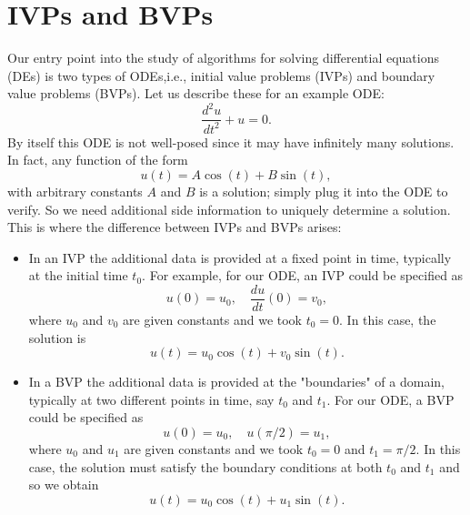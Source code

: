 \chapter{IVPs and BVPs}

Our entry point into the study of algorithms for solving differential 
equations (DEs) is two types of ODEs,i.e., initial value problems (IVPs) and boundary value problems (BVPs). Let us describe these for an example ODE: 
\begin{equation*}
    \frac{d^2 u}{dt^2} + u = 0.
\end{equation*}
By itself this ODE is not well-posed since it may have infinitely 
many solutions. In fact, any function of the form 
\begin{equation*}
    u(t) = A \cos(t) + B \sin(t),
\end{equation*}
with arbitrary constants $A$ and $B$ 
is a solution; simply plug it into the ODE to verify. So we need additional 
side information to uniquely determine a solution. This is where 
the difference between IVPs and BVPs arises: 

\begin{itemize}
    \item In an IVP the additional data is provided at a fixed 
    point in time, typically at the initial time $t_0$. 
    For example, for our ODE, an IVP could be specified as
    \begin{equation*}
        u(0) = u_0, \quad \frac{du}{dt}(0) = v_0,
    \end{equation*}
    where $u_0$ and $v_0$ are given constants and we took $t_0 = 0$. In this case, the 
    solution is  
    \begin{equation*}
        u(t) = u_0 \cos(t) + v_0 \sin(t). 
    \end{equation*}

    \item In a BVP the additional data is provided at the "boundaries"
     of a domain, typically at two different points in time, 
     say $t_0$ and $t_1$. 
    For our ODE, a BVP could be specified as
    \begin{equation*}
        u(0) = u_0, \quad u(\pi/2) = u_1,
    \end{equation*}
    where $u_0$ and $u_1$ are given constants and we took $t_0 = 0$ 
    and $t_1 = \pi/2$. In this case, the 
    solution must satisfy the boundary conditions at 
    both $t_0$ and $t_1$ and so we obtain 
    \begin{equation*}
        u(t) = u_0 \cos(t) + u_1 \sin(t).
       \end{equation*}
\end{itemize}

